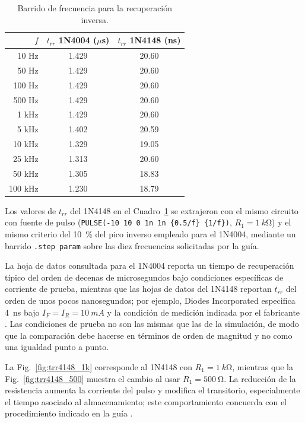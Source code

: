 \documentclass[journal,a4paper]{IEEEtran}
\begin{document}
\begin{table}[htbp]
\centering
\caption{Barrido de frecuencia para la recuperación inversa.}
\label{tab:barrido}
\scriptsize
\begin{tabular}{rcc}
\toprule
$f$ & $t_{rr}$ 1N4004 ($\mu$s) & $t_{rr}$ 1N4148 (ns) \\
\midrule
10 Hz     & 1.429 & 20.60 \\
50 Hz     & 1.429 & 20.60 \\
100 Hz    & 1.429 & 20.60 \\
500 Hz    & 1.429 & 20.60 \\
1 kHz     & 1.429 & 20.60 \\
5 kHz     & 1.402 & 20.59 \\
10 kHz    & 1.329 & 19.05 \\
25 kHz    & 1.313 & 20.60 \\
50 kHz    & 1.305 & 18.83 \\
100 kHz   & 1.230 & 18.79 \\
\bottomrule
\end{tabular}
\end{table}

Los valores de $t_{rr}$ del 1N4148 en el Cuadro~\ref{tab:barrido} se extrajeron con el mismo circuito con fuente de pulso (\texttt{PULSE(-10 10 0 1n 1n \{0.5/f\} \{1/f\})}, $R_1=\SI{1}{k\ohm}$) y el mismo criterio del \SI{10}{\percent} del pico inverso empleado para el 1N4004, mediante un barrido \texttt{.step param} sobre las diez frecuencias solicitadas por la guía.

La hoja de datos consultada para el 1N4004 reporta un tiempo de recuperación típico del orden de decenas de microsegundos bajo condiciones específicas de corriente de prueba, mientras que las hojas de datos del 1N4148 reportan $t_{rr}$ del orden de unos pocos nanosegundos; por ejemplo, Diodes Incorporated especifica \SI{4}{ns} bajo $I_F=I_R=\SI{10}{mA}$ y la condición de medición indicada por el fabricante \cite{d4004,d4148}. Las condiciones de prueba no son las mismas que las de la simulación, de modo que la comparación debe hacerse en términos de orden de magnitud y no como una igualdad punto a punto.

La Fig.~\ref{fig:trr4148_1k} corresponde al 1N4148 con $R_1=\SI{1}{k\ohm}$, mientras que la Fig.~\ref{fig:trr4148_500} muestra el cambio al usar $R_1=\SI{500}{\ohm}$. La reducción de la resistencia aumenta la corriente del pulso y modifica el transitorio, especialmente el tiempo asociado al almacenamiento; este comportamiento concuerda con el procedimiento indicado en la guía \cite{guia}.
\end{document}
